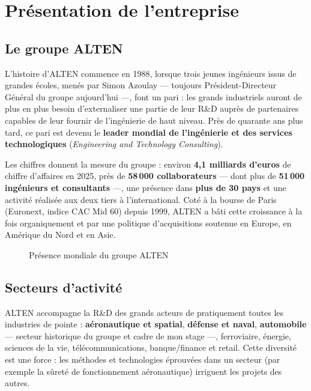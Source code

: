 \chapter{Présentation de l'entreprise}
\chapminitoc

\section{Le groupe ALTEN}

L'histoire d'ALTEN commence en 1988, lorsque trois jeunes ingénieurs issus de
grandes écoles, menés par Simon Azoulay --- toujours Président-Directeur Général
du groupe aujourd'hui ---, font un pari : les grands industriels auront de plus
en plus besoin d'externaliser une partie de leur R\&D auprès de partenaires
capables de leur fournir de l'ingénierie de haut niveau. Près de quarante ans
plus tard, ce pari est devenu le \textbf{leader mondial de l'ingénierie et des
services technologiques} (\emph{Engineering and Technology Consulting}).

Les chiffres donnent la mesure du groupe : environ \textbf{4,1 milliards
d'euros} de chiffre d'affaires en 2025, près de \textbf{58\,000 collaborateurs}
--- dont plus de \textbf{51\,000 ingénieurs et consultants} ---, une présence
dans \textbf{plus de 30 pays} et une activité réalisée aux deux tiers à
l'international. Coté à la bourse de Paris (Euronext, indice CAC Mid 60) depuis
1999, ALTEN a bâti cette croissance à la fois organiquement et par une
politique d'acquisitions soutenue en Europe, en Amérique du Nord et en Asie.

\begin{figure}[ht]
  \centering
  \caption{Présence mondiale du groupe ALTEN}
\end{figure}

\section{Secteurs d'activité}

ALTEN accompagne la R\&D des grands acteurs de pratiquement toutes les
industries de pointe : \textbf{aéronautique et spatial}, \textbf{défense et
naval}, \textbf{automobile} --- secteur historique du groupe et cadre de mon
stage ---, ferroviaire, énergie, sciences de la vie, télécommunications,
banque/finance et retail. Cette diversité est une force : les méthodes et
technologies éprouvées dans un secteur (par exemple la sûreté de
fonctionnement aéronautique) irriguent les projets des autres.

